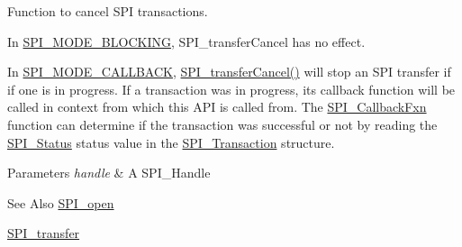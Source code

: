 Function to cancel S\-P\-I transactions. 

In \hyperlink{_s_p_i_8h_ab9ea76c6529d6076eee5e1c4a5a92c6fa0dfb2358e008316426895e7237c398e8}{S\-P\-I\-\_\-\-M\-O\-D\-E\-\_\-\-B\-L\-O\-C\-K\-I\-N\-G}, S\-P\-I\-\_\-transfer\-Cancel has no effect.

In \hyperlink{_s_p_i_8h_ab9ea76c6529d6076eee5e1c4a5a92c6fa5631e69925c47a62a261c78ebbda39fb}{S\-P\-I\-\_\-\-M\-O\-D\-E\-\_\-\-C\-A\-L\-L\-B\-A\-C\-K}, \hyperlink{_s_p_i_8h_a6819f7761fc3505c4f885653ff8121f0}{S\-P\-I\-\_\-transfer\-Cancel()} will stop an S\-P\-I transfer if if one is in progress. If a transaction was in progress, its callback function will be called in context from which this A\-P\-I is called from. The \hyperlink{_s_p_i_8h_aeb03e7608a14021c3b0acf92c90e2168}{S\-P\-I\-\_\-\-Callback\-Fxn} function can determine if the transaction was successful or not by reading the \hyperlink{_s_p_i_8h_adf1c6e6f919dd9f6887da6590a52fd6a}{S\-P\-I\-\_\-\-Status} status value in the \hyperlink{struct_s_p_i___transaction}{S\-P\-I\-\_\-\-Transaction} structure.


\begin{DoxyParams}{Parameters}
{\em handle} & A S\-P\-I\-\_\-\-Handle\\
\hline
\end{DoxyParams}
\begin{DoxySeeAlso}{See Also}
\hyperlink{_s_p_i_8h_a62cfe494cb1df47cd602e8747e894fd1}{S\-P\-I\-\_\-open} 

\hyperlink{_s_p_i_8h_a989e17f96b54fcc3dc2cac5f8ac6bdb2}{S\-P\-I\-\_\-transfer} 
\end{DoxySeeAlso}
